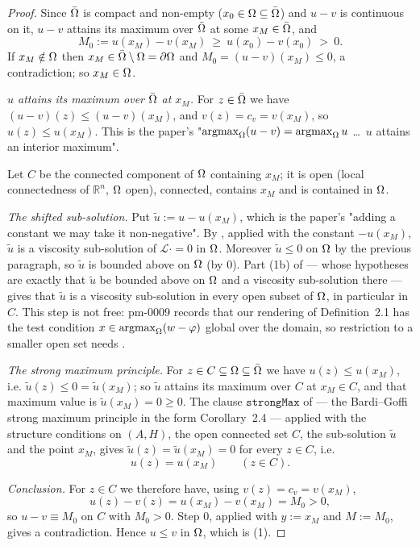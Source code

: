 \begin{proof}
Since $\bar{\Omega}$ is compact and non-empty ($x_0\in\Omega\subseteq\bar{\Omega}$) and $u-v$ is
continuous on it, $u-v$ attains its maximum over $\bar{\Omega}$ at some $x_M\in\bar{\Omega}$, and
\[
 M_0:=u(x_M)-v(x_M)\ \ge\ u(x_0)-v(x_0)\ >\ 0 .
\]
If $x_M\notin\Omega$ then $x_M\in\bar{\Omega}\setminus\Omega=\partial\Omega$ and $M_0=(u-v)(x_M)\le0$, a
contradiction; so $x_M\in\Omega$.

\emph{$u$ attains its maximum over $\bar{\Omega}$ at $x_M$.} For $z\in\bar{\Omega}$ we have
$(u-v)(z)\le(u-v)(x_M)$, and $v(z)=c_v=v(x_M)$, so $u(z)\le u(x_M)$. This is the paper's
"$\operatorname*{argmax}_\Omega(u-v)=\operatorname*{argmax}_\Omega u$ \dots\ $u$ attains an interior maximum".

Let $C$ be the connected component of $\Omega$ containing $x_M$; it is open (local
connectedness of $\mathbb R^{n}$, $\Omega$ open), connected, contains $x_M$ and is contained in
$\Omega$.

\emph{The shifted sub-solution.} Put $\tilde u:=u-u(x_M)$, which is the paper's "adding a
constant we may take it non-negative". By , applied with the
constant $-u(x_M)$, $\tilde u$ is a viscosity sub-solution of $\mathcal L\cdot=0$ in $\Omega$.
Moreover $\tilde u\le0$ on $\Omega$ by the previous paragraph, so $\tilde u$ is bounded above on
$\Omega$ (by $0$). Part (1b) of  --- whose hypotheses are exactly
that $\tilde u$ be bounded above on $\Omega$ and a viscosity sub-solution there --- gives that
$\tilde u$ is a viscosity sub-solution in every open subset of $\Omega$, in particular in $C$.
This step is not free: pm-0009 records that our rendering of Definition~2.1 has the test condition
$x\in\operatorname*{argmax}_\Omega(w-\varphi)$ global over the domain, so restriction to a smaller open set
needs .

\emph{The strong maximum principle.} For $z\in C\subseteq\Omega\subseteq\bar{\Omega}$ we have
$u(z)\le u(x_M)$, i.e. $\tilde u(z)\le0=\tilde u(x_M)$; so $\tilde u$ attains its maximum
over $C$ at $x_M\in C$, and that maximum value is $\tilde u(x_M)=0\ge0$. The clause
$\mathtt{strongMax}$ of  --- the Bardi--Goffi strong maximum principle
in the form Corollary~2.4 --- applied with the structure conditions on $(A,H)$, the open connected
set $C$, the sub-solution $\tilde u$ and the point $x_M$, gives
$\tilde u(z)=\tilde u(x_M)=0$ for every $z\in C$, i.e.
\[
 u(z)=u(x_M)\qquad(z\in C).
\]

\emph{Conclusion.} For $z\in C$ we therefore have, using $v(z)=c_v=v(x_M)$,
\[
 u(z)-v(z)=u(x_M)-v(x_M)=M_0>0 ,
\]
so $u-v\equiv M_0$ on $C$ with $M_0>0$. Step 0, applied with $y:=x_M$ and $M:=M_0$, gives a
contradiction. Hence $u\le v$ in $\Omega$, which is (1).


\end{proof}
